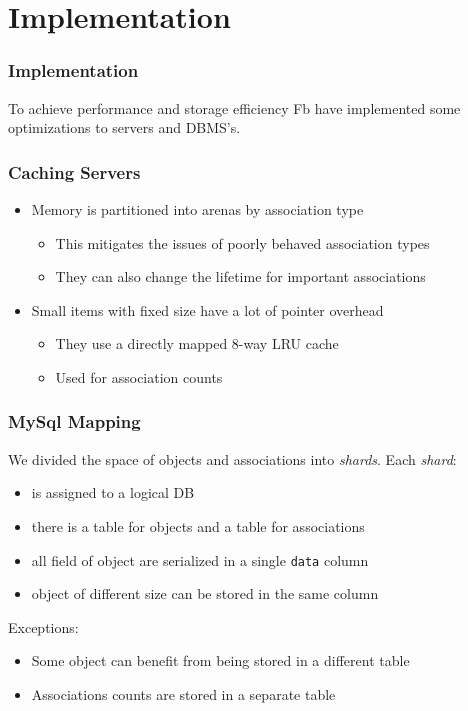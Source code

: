 \section{Implementation}
\begin{frame}
\frametitle{Implementation}
To achieve performance and storage efficiency Fb have implemented some optimizations to servers and DBMS's. 
\end{frame}

\begin{frame}[c]\frametitle{Caching Servers}
\begin{itemize}
	\item Memory is partitioned into arenas by association type
	\begin{itemize}
		\item This mitigates the issues of poorly behaved association types
		\item They can also change the lifetime for important associations
	\end{itemize}
	\item Small items with fixed size have a lot of pointer overhead
	\begin{itemize}
		\item They use a directly mapped 8-way LRU cache
		\item Used for association counts
	\end{itemize}
\end{itemize}    
\end{frame}

\begin{frame}[fragile]\frametitle{MySql Mapping}
    We divided the space of objects and associations into \emph{shards}. Each \emph{shard}:
    \begin{itemize}
    	\item is assigned to a logical DB
    	\item there is a table for objects and a table for associations
    	\item all field of object are serialized in a single \verb!data! column
    	\item object of different size can be stored in the same column
    \end{itemize}
Exceptions:
\begin{itemize}
	\item Some object can benefit from being stored in a different table
	\item Associations counts are stored in a separate table
\end{itemize}
\end{frame}


